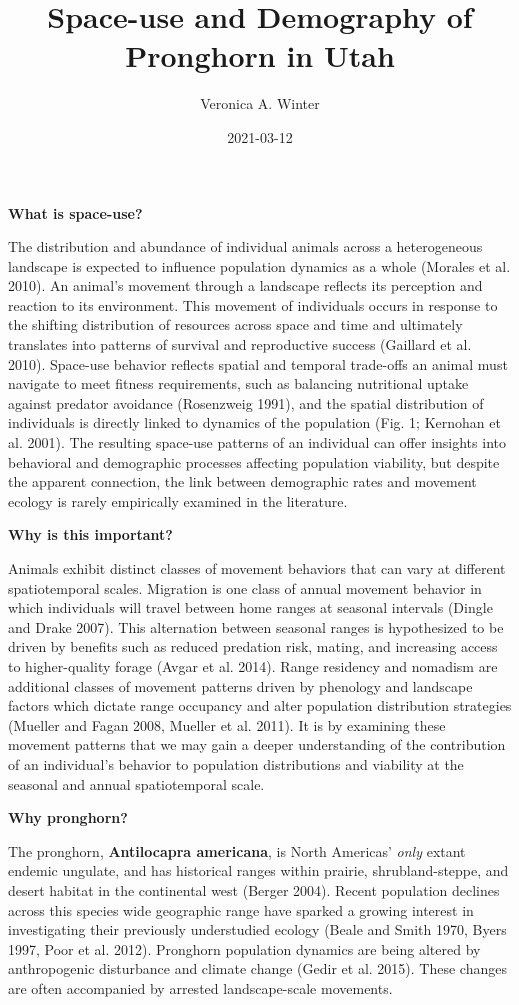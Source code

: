\documentclass[]{book}
\title{Space-use and Demography of Pronghorn in Utah}
\author{Veronica A. Winter}
\date{2021-03-12}
\begin{document}
\maketitle

{
\setcounter{tocdepth}{1}
\tableofcontents
}
\textbf{What is space-use?}

The distribution and abundance of individual animals across a
heterogeneous landscape is expected to influence population dynamics as
a whole (Morales et al. 2010). An animal's movement through a landscape
reflects its perception and reaction to its environment. This movement
of individuals occurs in response to the shifting distribution of
resources across space and time and ultimately translates into patterns
of survival and reproductive success (Gaillard et al. 2010). Space-use
behavior reflects spatial and temporal trade-offs an animal must
navigate to meet fitness requirements, such as balancing nutritional
uptake against predator avoidance (Rosenzweig 1991), and the spatial
distribution of individuals is directly linked to dynamics of the
population (Fig. 1; Kernohan et al. 2001). The resulting space-use
patterns of an individual can offer insights into behavioral and
demographic processes affecting population viability, but despite the
apparent connection, the link between demographic rates and movement
ecology is rarely empirically examined in the literature.

\textbf{Why is this important?}

Animals exhibit distinct classes of movement behaviors that can vary at
different spatiotemporal scales. Migration is one class of annual
movement behavior in which individuals will travel between home ranges
at seasonal intervals (Dingle and Drake 2007). This alternation between
seasonal ranges is hypothesized to be driven by benefits such as reduced
predation risk, mating, and increasing access to higher-quality forage
(Avgar et al. 2014). Range residency and nomadism are additional classes
of movement patterns driven by phenology and landscape factors which
dictate range occupancy and alter population distribution strategies
(Mueller and Fagan 2008, Mueller et al. 2011). It is by examining these
movement patterns that we may gain a deeper understanding of the
contribution of an individual's behavior to population distributions and
viability at the seasonal and annual spatiotemporal scale.

\textbf{Why pronghorn?}

The pronghorn, \textbf{Antilocapra americana}, is North Americas'
\emph{only} extant endemic ungulate, and has historical ranges within
prairie, shrubland-steppe, and desert habitat in the continental west
(Berger 2004). Recent population declines across this species wide
geographic range have sparked a growing interest in investigating their
previously understudied ecology (Beale and Smith 1970, Byers 1997, Poor
et al. 2012). Pronghorn population dynamics are being altered by
anthropogenic disturbance and climate change (Gedir et al. 2015). These
changes are often accompanied by arrested landscape-scale movements.
\end{document}

